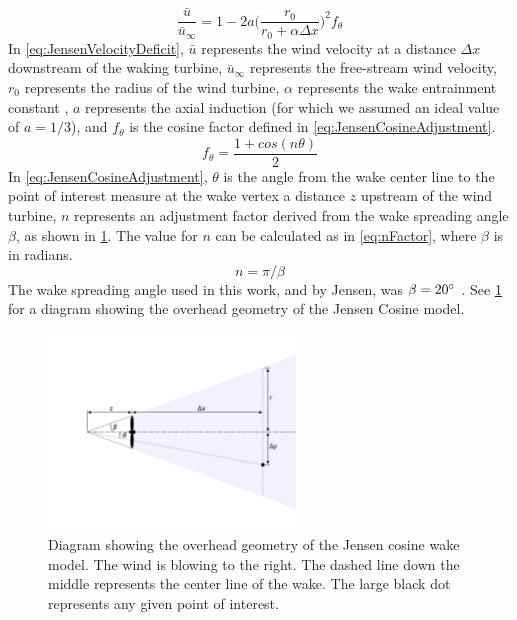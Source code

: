 \documentclass[a4paper]{jpconf}
\begin{document}
\begin{equation}
\frac{ \bar{u}}{\bar{u}_\infty} = 1 - 2a \bigg(\frac{r_0}{r_0 + \alpha \Delta x} \bigg)^2 f_\theta 
\label{eq:JensenVelocityDeficit}
\end{equation}
%
In \cref{eq:JensenVelocityDeficit}, $\bar{u}$ represents the wind velocity at a distance $\Delta x$ downstream of the waking turbine, $\bar{u}_\infty$ represents the free-stream wind velocity, $r_0$ represents the radius of the wind turbine, $\alpha$ represents the wake entrainment constant \cite{jensen1983}, $a$ represents the axial induction (for which we assumed an ideal value of $a = 1/3$), and $f_\theta$ is the cosine factor defined in \cref{eq:JensenCosineAdjustment}.
%
\begin{equation}
f_\theta = \frac{1 + cos(n\theta)}{2}
\label{eq:JensenCosineAdjustment}
\end{equation}
%
In \cref{eq:JensenCosineAdjustment},  $\theta$ is the angle from the wake center line to the point of interest measure at the wake vertex a distance $z$ upstream of the wind turbine, $n$ represents an adjustment factor derived from the wake spreading angle $\beta$, as shown in \cref{fig:JensenDiagrams}. The value for $n$ can be calculated as in \cref{eq:nFactor}, where $\beta$ is in radians.
%
\begin{equation}
n = \pi / \beta
\label{eq:nFactor}
\end{equation}
%
The wake spreading angle used in this work, and by Jensen, was $\beta = 20 \degree$  \cite{jensen1983}. See \cref{fig:JensenDiagrams} for a diagram showing the overhead geometry of the Jensen Cosine model.
%
\begin{figure}[h!]
	\centering
	\includegraphics[width=0.6\textwidth,trim={3.5cm 2cm 0cm 2cm} ]{jensen_diagram}
	\caption{Diagram showing the overhead geometry of the Jensen cosine wake model. The wind is blowing to the right. The dashed line down the middle represents the center line of the wake. The large black dot represents any given point of interest.}
	\label{fig:JensenDiagrams}
\end{figure}
\end{document}
